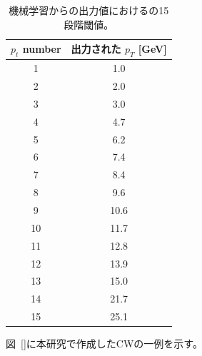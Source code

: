 \begin{table}[thb]
\centering
    \caption{機械学習からの出力値におけるの15段階閾値。}
    \label{Effective_number}
    \begin{tabular}{|c|c|}
        \hline
        $p_t$ number & 出力された $p_T$ [GeV]\\
        \hline
        1 & 1.0\\
        \hline
        2 & 2.0\\
        \hline
        3 & 3.0\\
        \hline
        4 & 4.7\\
        \hline
        5 & 6.2\\
        \hline
        6 & 7.4\\
        \hline
        7 & 8.4\\
        \hline
        8 & 9.6\\
        \hline
        9 & 10.6\\
        \hline
        10 & 11.7\\
        \hline
        11 & 12.8\\
        \hline
        12 & 13.9\\
        \hline
        13 & 15.0\\
        \hline
        14 & 21.7\\
        \hline
        15 & 25.1\\
        \hline
        
    \end{tabular}
\end{table}

図~\ref{}に本研究で作成したCWの一例を示す。




